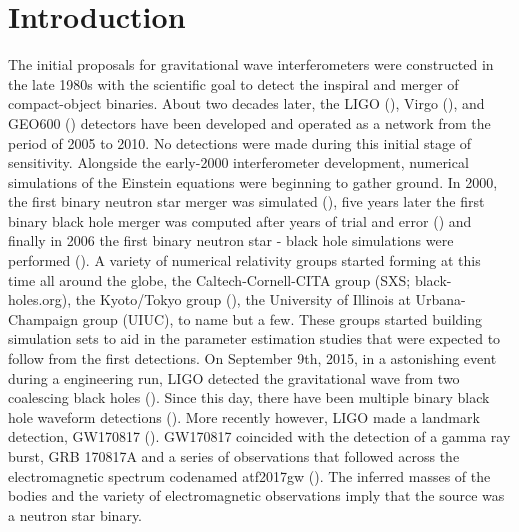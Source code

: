 
\chapter{Introduction}
\label{chap:intro}

The initial proposals for gravitational wave interferometers were
constructed in the late 1980s with the scientific goal to detect the inspiral and merger of compact-object binaries. About two decades later, the LIGO (\cite{ligo2018gwtc}), Virgo (\cite{acernese2015advanced}), and GEO600 (\cite{affeldt2014advanced}) detectors have been developed and operated as a network from the period of 2005 to 2010. No detections were made during this initial stage of sensitivity. Alongside the early-2000 interferometer development, numerical simulations of the Einstein equations were beginning to gather ground. In 2000, the first binary neutron star merger was simulated (\cite{shibata2000simulation}), five years later the first binary black hole merger was computed after years of trial and error (\cite{pretorius2005a}) and finally in 2006 the first binary neutron star - black hole simulations were performed (\cite{shibata2006merger}). A variety of numerical relativity groups started forming at this time all around the globe, the Caltech-Cornell-CITA group (SXS; black-holes.org), the Kyoto/Tokyo group (\cite{nagakura:2014hza}), the University of Illinois at Urbana-Champaign group (UIUC), to name but a few. These groups started building simulation sets to aid in the parameter estimation studies that were expected to follow from the first detections. On September 9th, 2015, in a astonishing event during a engineering run, LIGO detected the gravitational wave from two coalescing black holes (\cite{theligoscientific:2016wfe}). Since this day, there have been multiple binary black hole waveform detections (\cite{ligo2018gwtc}). More recently however, LIGO made a landmark detection, GW170817 (\cite{abbott2017gw170817}). GW170817
coincided with the detection of a gamma ray burst, GRB 170817A and a series of observations that followed across the electromagnetic spectrum codenamed atf2017gw (\cite{villar:2017wcc}). The inferred masses of the bodies and the variety of electromagnetic observations imply that the source was a neutron star binary.

